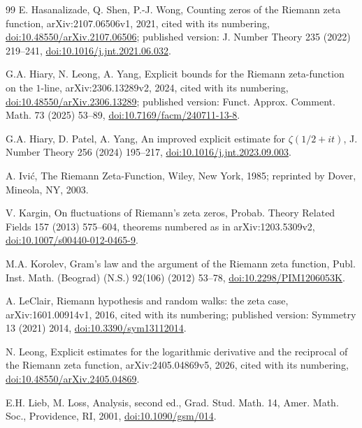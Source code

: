 \documentclass[11pt,a4paper]{article}
\numberwithin{equation}{section}
\theoremstyle{definition}
\theoremstyle{remark}
\begin{document}
\begin{thebibliography}{99}
 E. Hasanalizade, Q. Shen, P.-J. Wong, Counting zeros of the Riemann zeta function, arXiv:2107.06506v1, 2021, cited with its numbering, \href{https://doi.org/10.48550/arXiv.2107.06506}{doi:10.48550/arXiv.2107.06506}; published version: J. Number Theory 235 (2022) 219--241, \href{https://doi.org/10.1016/j.jnt.2021.06.032}{doi:10.1016/j.jnt.2021.06.032}.

 G.A. Hiary, N. Leong, A. Yang, Explicit bounds for the Riemann zeta-function on the $1$-line, arXiv:2306.13289v2, 2024, cited with its numbering, \href{https://doi.org/10.48550/arXiv.2306.13289}{doi:10.48550/arXiv.2306.13289}; published version: Funct. Approx. Comment. Math. 73 (2025) 53--89, \href{https://doi.org/10.7169/facm/240711-13-8}{doi:10.7169/facm/240711-13-8}.

 G.A. Hiary, D. Patel, A. Yang, An improved explicit estimate for $\zeta(1/2+it)$, J. Number Theory 256 (2024) 195--217, \href{https://doi.org/10.1016/j.jnt.2023.09.003}{doi:10.1016/j.jnt.2023.09.003}.

 A. Ivi\'c, The Riemann Zeta-Function, Wiley, New York, 1985; reprinted by Dover, Mineola, NY, 2003.

 V. Kargin, On fluctuations of Riemann's zeta zeros, Probab. Theory Related Fields 157 (2013) 575--604, theorems numbered as in arXiv:1203.5309v2, \href{https://doi.org/10.1007/s00440-012-0465-9}{doi:10.1007/s00440-012-0465-9}.

 M.A. Korolev, Gram's law and the argument of the Riemann zeta function, Publ. Inst. Math. (Beograd) (N.S.) 92(106) (2012) 53--78, \href{https://doi.org/10.2298/PIM1206053K}{doi:10.2298/PIM1206053K}.

 A. LeClair, Riemann hypothesis and random walks: the zeta case, arXiv:1601.00914v1, 2016, cited with its numbering; published version: Symmetry 13 (2021) 2014, \href{https://doi.org/10.3390/sym13112014}{doi:10.3390/sym13112014}.

 N. Leong, Explicit estimates for the logarithmic derivative and the reciprocal of the Riemann zeta function, arXiv:2405.04869v5, 2026, cited with its numbering, \href{https://doi.org/10.48550/arXiv.2405.04869}{doi:10.48550/arXiv.2405.04869}.

 E.H. Lieb, M. Loss, Analysis, second ed., Grad. Stud. Math. 14, Amer. Math. Soc., Providence, RI, 2001, \href{https://doi.org/10.1090/gsm/014}{doi:10.1090/gsm/014}.


\end{thebibliography}
\end{document}
